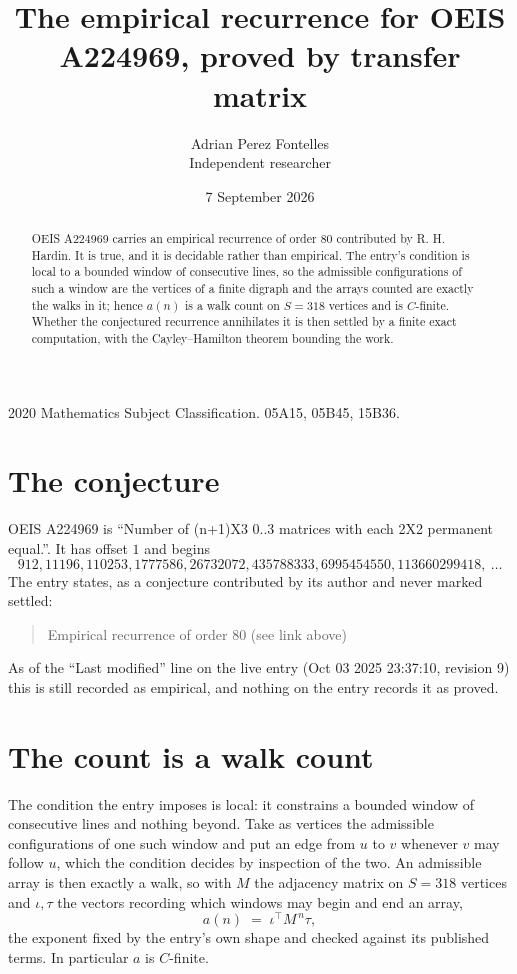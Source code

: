 \documentclass[11pt,a4paper]{article}
\title{The empirical recurrence for OEIS A224969, proved by transfer matrix}
\author{Adrian Perez Fontelles\\ \small Independent researcher}
\date{7 September 2026}
\theoremstyle{plain}
\theoremstyle{definition}
\begin{document}
\maketitle

\begin{abstract}
OEIS A224969 carries an empirical recurrence of order $80$ contributed by R. H. Hardin. It is
true, and it is decidable rather than empirical. The entry's condition is local to a bounded window of consecutive lines, so
the admissible configurations of such a window are the vertices of a finite digraph and the
arrays counted are exactly the walks in it; hence $a(n)$ is a walk count on $S=318$ vertices
and is $C$-finite. Whether the conjectured recurrence annihilates it is then settled by a
finite exact computation, with the Cayley--Hamilton theorem bounding the work.
\end{abstract}

\noindent\small 2020 Mathematics Subject Classification. 05A15, 05B45, 15B36.\normalsize

\section{The conjecture}

OEIS A224969 is ``Number of (n+1)X3 0..3 matrices with each 2X2 permanent equal.''. It has offset $1$ and begins
\[
912, 11196, 110253, 1777586, 26732072, 435788333, 6995454550, 113660299418,\ \dots
\]
The entry states, as a conjecture contributed by its author and never marked settled:
\begin{quote}
Empirical recurrence of order 80 (see link above)
\end{quote}
As of the ``Last modified'' line on the live entry (Oct 03 2025 23:37:10, revision 9) this is still
recorded as empirical, and nothing on the entry records it as proved.

\section{The count is a walk count}

The condition the entry imposes is local: it constrains a bounded window of consecutive lines and nothing beyond. Take as
vertices the admissible configurations of one such window and put an edge from $u$ to $v$
whenever $v$ may follow $u$, which the condition decides by inspection of the two. An
admissible array is then exactly a walk, so with $M$ the adjacency matrix on $S=318$ vertices
and $\iota,\tau$ the vectors recording which windows may begin and end an array,
\[
a(n)\;=\;\iota^{\!\top}M^{\,n}\tau ,
\]
the exponent fixed by the entry's own shape and checked against its published terms. In
particular $a$ is $C$-finite.
\end{document}
